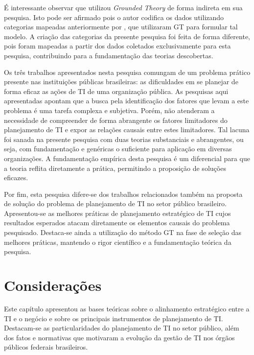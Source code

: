 É interessante observar que  utilizou \textit{Grounded Theory} de forma indireta em sua pesquisa. Isto pode ser afirmado pois o autor codifica os dados utilizando categorias mapeadas anteriormente por , que utilizaram GT para formular tal modelo. A criação das categorias da presente pesquisa foi feita de forma diferente, pois foram mapeadas a partir dos dados coletados exclusivamente para esta pesquisa, contribuindo para a fundamentação das teorias descobertas.

Os três trabalhos apresentados nesta pesquisa comungam de um problema prático presente nas instituições públicas brasileiras: as dificuldades em se planejar de forma eficaz as ações de TI de uma organização pública. As pesquisas aqui apresentadas apontam que a busca pela identificação dos fatores que levam a este problema é uma tarefa complexa e subjetiva. Porém, não atenderam a necessidade de compreender de forma abrangente os fatores limitadores do planejamento de TI e expor as relações causais entre estes limitadores. Tal lacuna foi sanada na presente pesquisa com duas teorias substanciais e abrangentes, ou seja, com fundamentação e genéricas o suficiente para aplicação em diversas organizações. A fundamentação empírica desta pesquisa é um diferencial para que a teoria reflita diretamente a prática, permitindo a proposição de soluções eficazes.

Por fim, esta pesquisa difere-se dos trabalhos relacionados também na proposta de solução do problema de planejamento de TI no setor público brasileiro. Apresentou-se as melhores práticas de planejamento estratégico de TI cujos resultados esperados atacam diretamente os elementos causais do problema pesquisado. Destaca-se ainda a utilização do método GT na fase de seleção das melhores práticas, mantendo o rigor científico e a fundamentação teórica da pesquisa.



\section{Considerações}
Este capítulo apresentou as bases teóricas sobre o alinhamento estratégico entre a TI e o negócio e sobre os principais instrumentos de planejamento de TI. Destacam-se as particularidades do planejamento de TI no setor público, além dos fatos e normativas que motivaram a evolução da gestão de TI nos órgãos públicos federais brasileiros.

